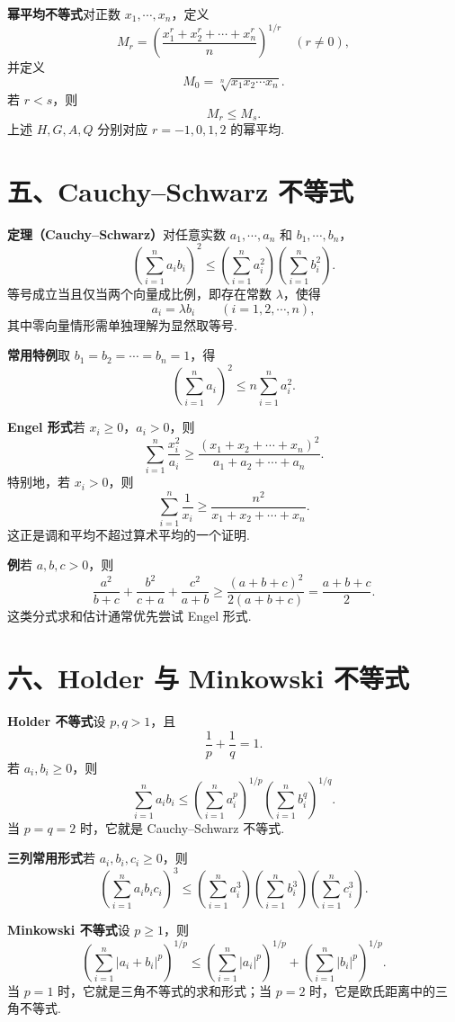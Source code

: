\documentclass[UTF8, 12pt, fontset=fandol, oneside]{ctexart}
\begin{document}
\noindent\textbf{幂平均不等式}\quad 对正数 $x_1,\cdots,x_n$，定义
\[
  M_r=
  \left(\frac{x_1^r+x_2^r+\cdots+x_n^r}{n}\right)^{1/r}
  \quad(r\ne0),
\]
并定义
\[
  M_0=\sqrt[n]{x_1x_2\cdots x_n}.
\]
若 $r<s$，则
\[
  M_r\le M_s.
\]
上述 $H,G,A,Q$ 分别对应 $r=-1,0,1,2$ 的幂平均.

\section*{五、Cauchy--Schwarz 不等式}

\noindent\textbf{定理（Cauchy--Schwarz）}\quad 对任意实数 $a_1,\cdots,a_n$ 和 $b_1,\cdots,b_n$，
\[
  \left(\sum_{i=1}^n a_i b_i\right)^2
  \le
  \left(\sum_{i=1}^n a_i^2\right)
  \left(\sum_{i=1}^n b_i^2\right).
\]
等号成立当且仅当两个向量成比例，即存在常数 $\lambda$，使得
\[
  a_i=\lambda b_i\qquad (i=1,2,\cdots,n),
\]
其中零向量情形需单独理解为显然取等号.

\noindent\textbf{常用特例}\quad 取 $b_1=b_2=\cdots=b_n=1$，得
\[
  \left(\sum_{i=1}^n a_i\right)^2
  \le
  n\sum_{i=1}^n a_i^2.
\]

\noindent\textbf{Engel 形式}\quad 若 $x_i\ge0$，$a_i>0$，则
\[
  \sum_{i=1}^n \frac{x_i^2}{a_i}
  \ge
  \frac{(x_1+x_2+\cdots+x_n)^2}{a_1+a_2+\cdots+a_n}.
\]
特别地，若 $x_i>0$，则
\[
  \sum_{i=1}^n \frac1{x_i}
  \ge
  \frac{n^2}{x_1+x_2+\cdots+x_n}.
\]
这正是调和平均不超过算术平均的一个证明.

\noindent\textbf{例}\quad 若 $a,b,c>0$，则
\[
  \frac{a^2}{b+c}+\frac{b^2}{c+a}+\frac{c^2}{a+b}
  \ge
  \frac{(a+b+c)^2}{2(a+b+c)}
  =
  \frac{a+b+c}{2}.
\]
这类分式求和估计通常优先尝试 Engel 形式.

\section*{六、Holder 与 Minkowski 不等式}

\noindent\textbf{Holder 不等式}\quad 设 $p,q>1$，且
\[
  \frac1p+\frac1q=1.
\]
若 $a_i,b_i\ge0$，则
\[
  \sum_{i=1}^n a_i b_i
  \le
  \left(\sum_{i=1}^n a_i^p\right)^{1/p}
  \left(\sum_{i=1}^n b_i^q\right)^{1/q}.
\]
当 $p=q=2$ 时，它就是 Cauchy--Schwarz 不等式.

\noindent\textbf{三列常用形式}\quad 若 $a_i,b_i,c_i\ge0$，则
\[
  \left(\sum_{i=1}^n a_i b_i c_i\right)^3
  \le
  \left(\sum_{i=1}^n a_i^3\right)
  \left(\sum_{i=1}^n b_i^3\right)
  \left(\sum_{i=1}^n c_i^3\right).
\]

\noindent\textbf{Minkowski 不等式}\quad 设 $p\ge1$，则
\[
  \left(\sum_{i=1}^n |a_i+b_i|^p\right)^{1/p}
  \le
  \left(\sum_{i=1}^n |a_i|^p\right)^{1/p}
  +
  \left(\sum_{i=1}^n |b_i|^p\right)^{1/p}.
\]
当 $p=1$ 时，它就是三角不等式的求和形式；当 $p=2$ 时，它是欧氏距离中的三角不等式.
\end{document}
